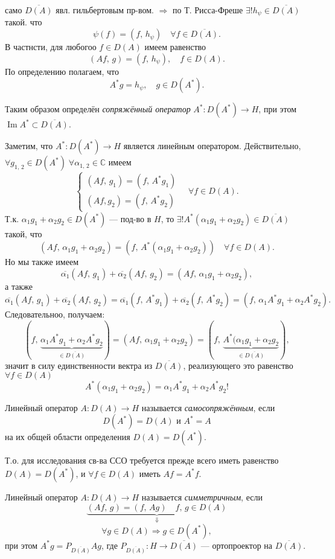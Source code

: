 само  $\overline{D(A)}$ явл. гильбертовым пр-вом. $\Rightarrow$ 
по Т. Рисса-Фреше $\exists! h_\psi\in \overline{D(A)}$ такой. что
\[
	\psi(f) = (f,\, h_\psi) \quad \forall f \in \overline{D(A)}
.\] 
В частнсти, для любогоо $f \in D(A)$ имеем равенство
\[
	(Af,\,g)= (f,\,h_\psi), \quad f \in D(A)
.\] 
По определению полагаем, что
\[
	A^* g = h_\psi,\quad g \in D(A^*)
.\] 
\begin{dfn}
Таким образом определён \emph{сопряжённый оператор} $A^*: D(A^*)\to H$,
при этом $\operatorname{Im}A^*\subset \overline{D(A)}$.
\end{dfn}
Заметим, что $A^* : D(A^*) \to H$
является линейным оператором. Действительно,
$\forall g_{1,\,2} \in D(A^*) \; \forall \alpha_{1,\,2} \in 
 \mathbb{C}$ имеем
 \[
\left\{
\begin{aligned}
	(Af,\, g_1) = (f,\, A^* g_1)\\
	(Af, g_2) =(f,\,A^* g_2)
\end{aligned}
\right.
\quad \forall f \in D(A)
 .\] 
 Т.\:к. $\alpha_1 g_1+\alpha_2 g_2 \in D(A^*)$ --- под-во в $H$,
 то  $\exists! A^* (\alpha_1 g_1 +\alpha_2 g_2) \in \overline{D(A)}$ 
такой, что
\[
	(Af,\, \alpha_1 g_1+\alpha_2 g_2)=(f,\, A^*(\alpha_1 g_1+
	\alpha_2 g_2)) \quad \forall f \in D(A)
.\] 
Но мы также имеем
\[
	\overline{\alpha_1} (Af,\, g_1)+ \overline{\alpha_2}(Af,\, g_2)=
	(A f,\,\alpha_1 g_1+\alpha_2 g_2)
 ,\]
а также
\[
	\overline{\alpha_1}(Af,\, g_1) +\overline{\alpha_2} (Af,\,g_2)= \overline{\alpha_1} (f,\,
	A^* g_1)+ \overline{\alpha_2} (f,\, A^* g_2)=
	(f,\,\alpha_1 A^* g_1+ \alpha_2 A^* g_2)
.\]
Следовательноо, получаем:
\[
	\left(f,\, \underbrace{\alpha_1 A^* g_1 +\alpha_2 A^* g_2}_{\in 
	\overline{D(A)}}\right)=
	(Af,\, \alpha_1 g_1 +\alpha_2 g_2)=
	\left( f,\, \underbrace{A^*(\alpha_1 g_1 +\alpha_2 g_2}_{\in 
	\overline{D(A)}} \right) 
,\]
значит в силу единственности вектра из $\overline{D(A)}$, реализующего
это равенство $\forall f \in D(A)$
\[
	A^*(\alpha_1 g_1+\alpha_2 g_2) = \alpha_1 A^* g_1+
	\alpha_2 A^* g_2 !
\] 
\begin{dfn}
	Линейный оператор $A: D(A) \to  H$ называется
	\emph{самосопряжённым}, если
	\[
		D(A^*)=D(A) \text{ и } A^*=A
	\]
	на их общей области определения
	$D(A)=D(A^*)$.
\end{dfn}
Т.\:о. для исследования св-ва ССО требуется прежде всего иметь
равенство \underline{$D(A)=D(A^*)$}, и $\forall f \in  D(A)$ иметь
$Af= A^* f$.
 \begin{dfn}
	 Линейный оператор  $A : D(A)\to  H$ называется \emph{симметричным},
	 если 
	 \[
		 \underbrace{(Af,\, g) =(f,\,Ag) \quad f,\,g \in D(A)}_{\Downarrow}
	 \]
\[
	\forall g \in D(A) \Rightarrow g \in D(A^*),
\]
при этом $A^* g = P_{\overline{D(A)}}A g$, где
$P_{\overline{D(A)}}: H \to \overline{D(A)}$ --- ортопроектор
на $\overline{D(A)}$.
\end{dfn}
